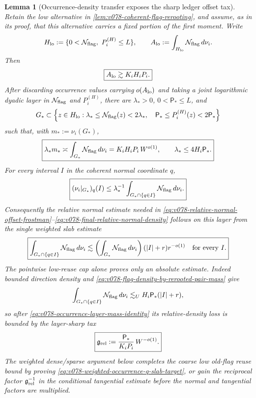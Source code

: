 \documentclass[10pt]{article}
\newtheorem{lemma}[theorem]{Lemma}
\begin{document}
\begin{lemma}[Occurrence-density transfer exposes the sharp ledger offset tax]
\label{lem:v078-occurrence-density-relative-offset-tax}
Retain the low alternative in \cref{lem:v078-coherent-flag-rerooting}, and assume, as in its proof,
that this alternative carries a fixed portion of the first moment.  Write
\[
H_{\rm lo}
:=
\{0<\mathcal N_{\rm flag},\ P_i^{(H)}\le L\},
\qquad
A_{\rm lo}
:=
\int_{H_{\rm lo}}\mathcal N_{\rm flag}\,d\nu_i.
\]
Then
\begin{equation}
\label{eq:v078-low-occurrence-retained-first-moment}
\boxed{
A_{\rm lo}\gtrsim K_iH_iP_i.
}
\end{equation}
After discarding occurrence values carrying \(o(A_{\rm lo})\) and taking a joint logarithmic
dyadic layer in \(\mathcal N_{\rm flag}\) and \(P_i^{(H)}\), there are
\(\lambda_*>0\), \(0<\mathsf P_*\le L\), and
\[
G_*
\subset
\left\{
z\in H_{\rm lo}:
\lambda_*\le\mathcal N_{\rm flag}(z)<2\lambda_*,
\quad
\mathsf P_*\le P_i^{(H)}(z)<2\mathsf P_*
\right\}
\]
such that, with \(m_*:=\nu_i(G_*)\),
\begin{equation}
\label{eq:v078-occurrence-layer-mass-identity}
\boxed{
\lambda_*m_*
\asymp
\int_{G_*}\mathcal N_{\rm flag}\,d\nu_i
=
K_iH_iP_i\,W^{o(1)},
\qquad
\lambda_*\le 4H_i\mathsf P_*.
}
\end{equation}
For every interval \(I\) in the coherent normal coordinate \(q\),
\begin{equation}
\label{eq:v078-occurrence-to-physical-q-slab}
\boxed{
(\nu_i|_{G_*})_q(I)
\le
\lambda_*^{-1}
\int_{G_*\cap\{q\in I\}}
\mathcal N_{\rm flag}\,d\nu_i.
}
\end{equation}
Consequently the relative normal estimate needed in
\eqref{eq:v078-relative-normal-offset-frostman}--\eqref{eq:v078-final-relative-normal-density}
follows on this layer from the single weighted slab estimate
\begin{equation}
\label{eq:v078-weighted-occurrence-q-slab-target}
\boxed{
\int_{G_*\cap\{q\in I\}}
\mathcal N_{\rm flag}\,d\nu_i
\lesssim
\left(\int_{G_*}\mathcal N_{\rm flag}\,d\nu_i\right)
(|I|+r)r^{-o(1)}
\quad\text{for every }I.
}
\end{equation}
The pointwise low-reuse cap alone proves only an absolute estimate.  Indeed bounded direction
density and \eqref{eq:v078-flag-density-by-rerooted-pair-mass} give
\begin{equation}
\label{eq:v078-trivial-occurrence-q-slab}
\int_{G_*\cap\{q\in I\}}
\mathcal N_{\rm flag}\,d\nu_i
\lesssim_U
H_i\mathsf P_*(|I|+r),
\end{equation}
so after \eqref{eq:v078-occurrence-layer-mass-identity} its relative-density loss is bounded by
the layer-sharp tax
\begin{equation}
\label{eq:v078-exact-relative-offset-tax}
\boxed{
\mathfrak g_{\rm rel}
:=
\frac{\mathsf P_*}{K_iP_i}\,W^{-o(1)}.
}
\end{equation}
The weighted dense/sparse argument below completes the coarse low old-flag reuse bound by proving
\eqref{eq:v078-weighted-occurrence-q-slab-target}, or gain the reciprocal factor
\(\mathfrak g_{\rm rel}^{-1}\) in the conditional tangential estimate before the normal and
tangential factors are multiplied.
\end{lemma}
\end{document}
